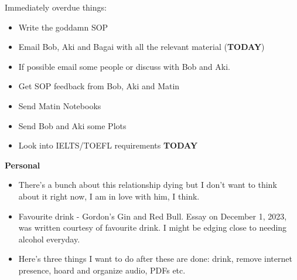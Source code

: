 \noindent {}
Immediately overdue things:
\begin{itemize}
    \item Write the goddamn SOP
    \item Email Bob, Aki and Bagai with all the relevant material (\textbf{TODAY})
    \item If possible email some people or discuss with Bob and Aki. 
    \item Get SOP feedback from Bob, Aki and Matin
    \item Send Matin Notebooks
    \item Send Bob and Aki some Plots
    \item Look into IELTS/TOEFL requirements \textbf{TODAY}
\end{itemize}

\noindent \textbf{Personal}\\
\begin{itemize}
    \item There's a bunch about this relationship dying but I don't want to think about it right now, I am in love with him, I think.
    \item Favourite drink - Gordon's Gin and Red Bull. Essay on December 1, 2023, was written courtesy of favourite drink. I might be edging close to needing alcohol everyday.
    \item  Here's three things I want to do after these are done: drink, remove internet presence, hoard and organize audio, PDFs etc.
\end{itemize}